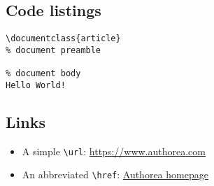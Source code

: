 \subsection{Code listings}
\begin{lstlisting}
\documentclass{article}
% document preamble

% document body
Hello World!

\end{lstlisting}

\subsection{Links}
\begin{itemize}
\item A simple \verb|\url|: \url{https://www.authorea.com}
\item An abbreviated \verb|\href|: \href{https://www.authorea.com}{Authorea homepage}
\end{itemize}